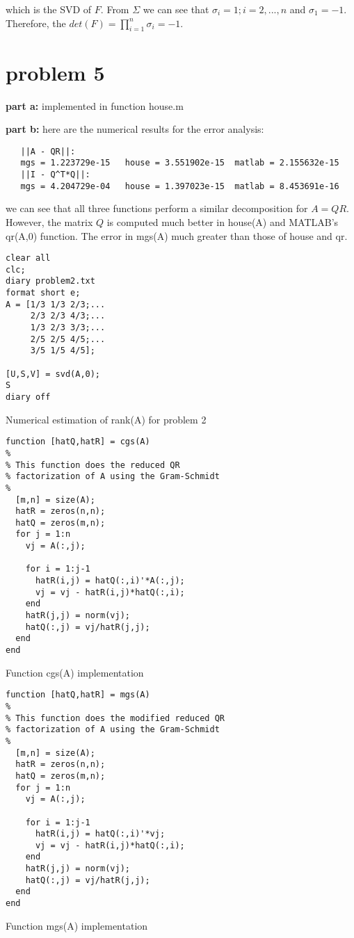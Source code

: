\documentclass[10pt]{article}
\begin{document}
which is the SVD of $F$. From $\Sigma$ we can see that $\sigma_i=1; i=2,...,n$ and $\sigma_1=-1$. Therefore, the $det(F) = \prod_{i=1}^{n} \sigma_i=-1$.

\section{problem 5}

\textbf{part a:} implemented in function house.m
 
\textbf{part b:} here are the numerical results  for the 
error analysis:
\begin{verbatim}
   ||A - QR||:
   mgs = 1.223729e-15   house = 3.551902e-15  matlab = 2.155632e-15 
   ||I - Q^T*Q||:
   mgs = 4.204729e-04   house = 1.397023e-15  matlab = 8.453691e-16 
\end{verbatim}

we can see that all three functions perform a similar decomposition
for $A=QR$. However, the matrix $Q$ is computed much better in 
house(A) and MATLAB's qr(A,0) function. The error in mgs(A) much greater
than those of house and qr.

\begin{program}
\begin{verbatim}
clear all
clc; 
diary problem2.txt
format short e; 
A = [1/3 1/3 2/3;...
     2/3 2/3 4/3;...
     1/3 2/3 3/3;...
     2/5 2/5 4/5;...
     3/5 1/5 4/5];

[U,S,V] = svd(A,0);
S
diary off
\end{verbatim}
  \caption{Numerical estimation of rank(A) for problem 2}
\end{program}

\begin{program}
\begin{verbatim}
function [hatQ,hatR] = cgs(A) 
%
% This function does the reduced QR
% factorization of A using the Gram-Schmidt
% 
  [m,n] = size(A);
  hatR = zeros(n,n);
  hatQ = zeros(m,n);
  for j = 1:n
    vj = A(:,j);

    for i = 1:j-1
      hatR(i,j) = hatQ(:,i)'*A(:,j);
      vj = vj - hatR(i,j)*hatQ(:,i);  
    end
    hatR(j,j) = norm(vj);
    hatQ(:,j) = vj/hatR(j,j);
  end
end
\end{verbatim}
  \caption{Function cgs(A) implementation}
\end{program}


\begin{program}
\begin{verbatim}
function [hatQ,hatR] = mgs(A) 
%
% This function does the modified reduced QR
% factorization of A using the Gram-Schmidt
% 
  [m,n] = size(A);
  hatR = zeros(n,n);
  hatQ = zeros(m,n);
  for j = 1:n
    vj = A(:,j);

    for i = 1:j-1
      hatR(i,j) = hatQ(:,i)'*vj;
      vj = vj - hatR(i,j)*hatQ(:,i);  
    end
    hatR(j,j) = norm(vj);
    hatQ(:,j) = vj/hatR(j,j);
  end
end
\end{verbatim}
  \caption{Function mgs(A) implementation}
\end{program}
\end{document}
